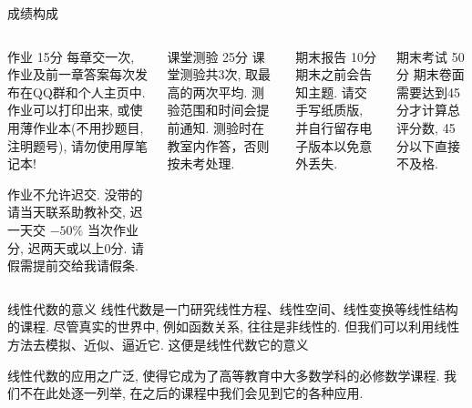 \begin{frame}{成绩构成}
	\onslide<+->
	\begin{columns}
		\onslide<+->
		\begin{block*}{作业 15分}
			\vspace{\baselineskip}
			每章交一次, 作业及前一章答案每次发布在QQ群和个人主页中. 
			作业可以打印出来, 或使用薄作业本(不用抄题目, 注明题号), 请勿使用厚笔记本! 
			\vspace{\baselineskip}

			\alert{作业不允许迟交}. 没带的请当天联系助教补交, 迟一天交 $-50\%$ 当次作业分, 迟两天或以上0分. 请假需提前交给我请假条. 
			\vspace{1.1\baselineskip}
		\end{block*}

		\onslide<+->
		\begin{block*}{课堂测验 25分}
			课堂测验共3次, 取最高的两次平均. 测验范围和时间会提前通知. \alert{测验时在教室内作答，否则按未考处理}. 
		\end{block*}

		\onslide<+->
		\begin{block*}{期末报告 10分}
			期末之前会告知主题. 请交手写纸质版, 并自行留存电子版本以免意外丢失. 
		\end{block*}

		\onslide<+->
		\begin{block*}{期末考试 50分}
			期末卷面需要达到45分才计算总评分数, 45分以下直接不及格. 
	\end{block*}
	\end{columns}
\end{frame}


\begin{frame}{线性代数的意义}
	\onslide<+->
	线性代数是一门研究线性方程、线性空间、线性变换等线性结构的课程.
	\onslide<+->
	尽管真实的世界中, 例如函数关系, 往往是非线性的.
	但我们可以利用线性方法去模拟、近似、逼近它.
	\onslide<+->
	这便是线性代数它的意义

	\onslide<+->
	线性代数的应用之广泛, 使得它成为了高等教育中大多数学科的必修数学课程.
	\onslide<+->
	我们不在此处逐一列举, 在之后的课程中我们会见到它的各种应用.
\end{frame}


